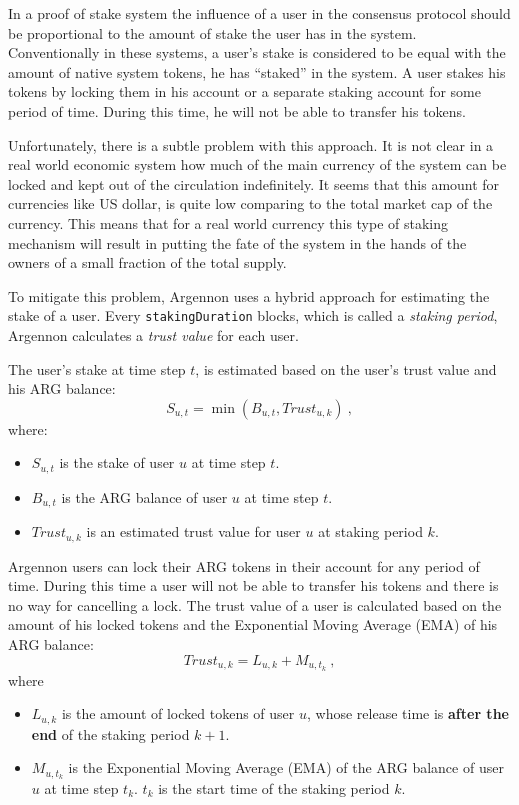 In a proof of stake system the influence of a user in the consensus protocol should be proportional to the amount
of stake the user has in the system. Conventionally in these systems, a user's stake is considered to be equal with the
amount of native system tokens, he has ``staked'' in the system. A user stakes his tokens by locking them in
his account or a separate staking account for some period of time. During this time, he will not be able to transfer
his tokens.

Unfortunately, there is a subtle problem with this approach. It is not clear in a real world economic system
how much of the main currency of the system can be locked and kept out of the circulation indefinitely. It seems that
this amount for currencies like US dollar, is quite low comparing to the total market cap of the currency.
This means that for a real world currency this type of staking mechanism will result in putting the
fate of the system in the hands of the owners of a small fraction of the total supply.

To mitigate this problem, Argennon uses a hybrid approach for estimating the stake of a user.
Every \texttt{stakingDuration} blocks, which is called a \emph{staking period}, Argennon calculates
a \emph{trust value} for each user.

The user's stake
at time step \(t\), is estimated based on the user's trust value and his ARG balance:
\begin{equation}
    S_{u,t} = \min (B_{u,t}, Trust_{u,k})\ ,\label{eq:stake}
\end{equation}
where:
\begin{itemize}
    \item \(S_{u,t}\) is the stake of user \(u\) at time step \(t\).
    \item \(B_{u,t}\) is the ARG balance of user \(u\) at time step \(t\).
    \item \(Trust_{u,k}\) is an estimated trust value for user \(u\) at staking period \(k\).
\end{itemize}

Argennon users can lock their ARG tokens in their account for any period of time. During this time a user
will not be able to transfer his tokens and there is no way for cancelling a lock.
The trust value of a user is calculated based on the amount of his locked tokens and the
Exponential Moving Average (EMA) of his ARG balance:
\begin{equation}
    Trust_{u,k} = L_{u,k} + M_{u,t_k}\ ,\label{eq:trust}
\end{equation}
where
\begin{itemize}
    \item $L_{u,k}$ is the amount of locked tokens of user $u$, whose release time is \textbf{after the end} of
    the staking period $k+1$.
    \item $M_{u,t_k}$ is the Exponential Moving Average (EMA) of the ARG balance of user \(u\) at time step \(t_k\).
    $t_k$ is the start time of the staking period $k$.
\end{itemize}

